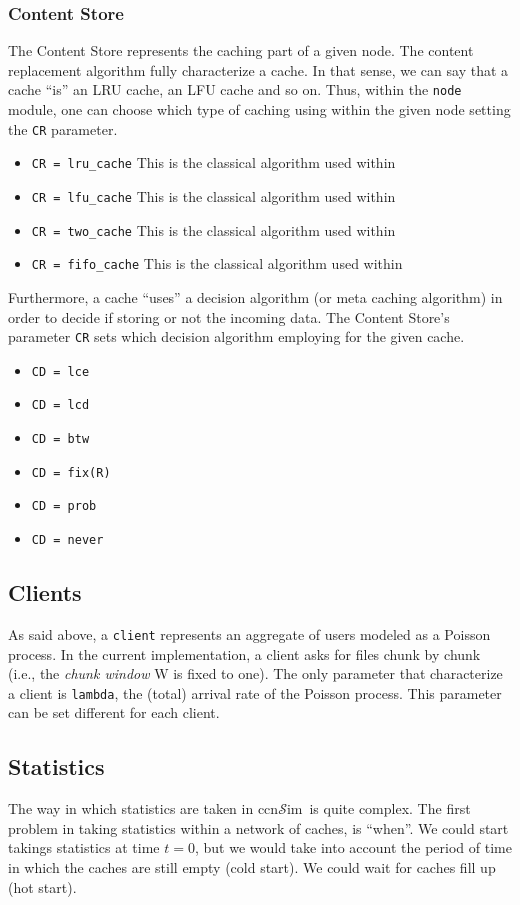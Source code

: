\documentclass{article}
\newcommand{\ccnsim}{ccn$\mathcal{S}$im}
\begin{document}
\subsubsection{Content Store}
The Content Store represents the caching part of a given node. The content replacement algorithm fully characterize a cache. In that sense, we can say that a cache ``is'' an LRU cache, an LFU cache and so on. Thus, within the \verb|node| module, one can choose which type of caching using within the given node setting the \verb|CR| parameter. 
\begin{itemize}
    \item\verb|CR = lru_cache| This is the classical algorithm used within 
    \item\verb|CR = lfu_cache| This is the classical algorithm used within 
    \item\verb|CR = two_cache| This is the classical algorithm used within 
    \item\verb|CR = fifo_cache| This is the classical algorithm used within 
\end{itemize}
Furthermore, a cache ``uses'' a decision algorithm (or meta caching algorithm) in order to decide if storing or not the incoming data. The Content Store's parameter \verb|CR| sets which decision algorithm employing for the given cache. 
\begin{itemize}
    \item \verb|CD = lce| 
    \item \verb|CD = lcd|
    \item \verb|CD = btw|
    \item \verb|CD = fix(R)|
    \item \verb|CD = prob|
    \item \verb|CD = never|
\end{itemize}


\subsection{Clients}
As said above, a \verb|client| represents an aggregate of users modeled as a Poisson process. In the current implementation, a client asks for files chunk by chunk (i.e., the \emph{chunk window} W is fixed to one). The only parameter that characterize a client is \verb|lambda|, the (total) arrival rate of the Poisson process. This parameter can be set different for each client. 
\subsection{Statistics}
The way in which statistics are taken in \ccnsim\ is quite complex. The first problem in taking statistics within a network of caches, is ``when''. We could start takings statistics at time $t = 0$, but we would take into account the period of time in which the caches are still empty (cold start). We could wait for caches fill up (hot start). 
\end{document}
